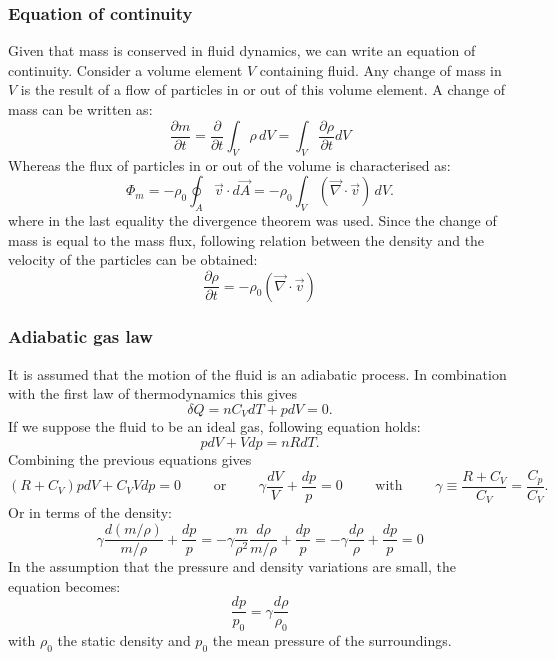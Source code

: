 \subsubsection*{Equation of continuity}
Given that mass is conserved in fluid dynamics, we can write an equation of continuity. Consider a volume element $V$ containing fluid. Any change of mass in $V$ is the result of a flow of particles in or out of this volume element. A change of mass can be written as:
\[
\frac{\partial m}{\partial t} = \frac{\partial }{\partial t} \int_{V} \rho \,dV =\int_{V} \frac{\partial \rho}{\partial t} dV
\]
Whereas the flux of particles in or out of the volume is characterised as:
\[
\Phi_m
= - \rho_0 \oint_A \vec{v} \cdot d\vec{A}
= - \rho_0 \int_{V} (\vec{\nabla} \cdot \vec{v}) \, dV.
\]
where in the last equality the divergence theorem was used.
Since the change of mass is equal to the mass flux, following relation between the density and the velocity of the particles can be obtained:
\begin{equation}
\frac{\partial \rho}{\partial t}  = - \rho_0 (\vec{\nabla} \cdot \vec{v})
\label{cont}
\end{equation}


\subsubsection*{Adiabatic gas law}
It is assumed that the motion of the fluid is an adiabatic process. In combination with the first law of thermodynamics this gives
\[
\delta Q = n C_V dT + p dV = 0.
\]
If we suppose the fluid to be an ideal gas, following equation holds:
\[
p dV + V dp = n R dT.
\]
Combining the previous equations gives
\[
(R+ C_V ) p dV + C_V V dp = 0  \qquad \textrm{ or } \qquad \gamma \frac{dV}{V} + \frac{dp}{p} = 0 \qquad \textrm{ with } \qquad \gamma \equiv \frac{R+C_V}{C_V} = \frac{C_p}{C_V}.
\]
Or in terms of the density:
\[
\gamma \frac{d(m/\rho)}{m/ \rho} + \frac{dp}{p} = -\gamma \frac{m}{\rho^2} \frac{d\rho}{m/ \rho} + \frac{dp}{p} =- \gamma \frac{d\rho}{\rho} + \frac{dp}{p} =0
\]
In the assumption that the pressure and density variations are small, the equation becomes:
\begin{equation}
\frac{dp}{p_0} =\gamma \frac{d\rho}{\rho_0}
\label{adia}
\end{equation}
with $\rho_0$ the static density and $p_0$ the mean pressure of the surroundings.





